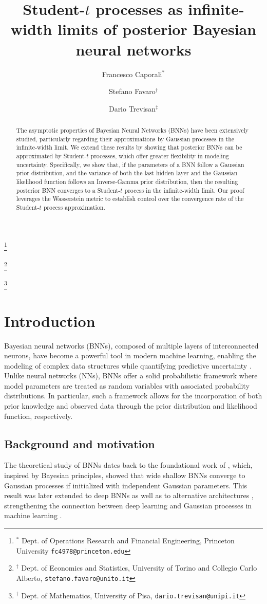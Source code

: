 \documentclass[a4paper, 11pt, reqno]{amsart}
\title[Student-\texorpdfstring{$t$}{t} processes as infinite-width limits of posterior BNNs]{Student-\texorpdfstring{$t$}{t} processes as infinite-width limits of posterior Bayesian neural networks}
\author[F. Caporali]{Francesco Caporali$^*$}
\author[S. Favaro]{Stefano Favaro$^\dag$}
\author[D. Trevisan]{Dario Trevisan$^\ddag$}
\affiliation[$^*$]{Dept. of Operations Research and Financial Engineering, Princeton University \texttt{fc4978@princeton.edu}}
\affiliation[$^\dag$]{Dept. of Economics and Statistics, University of Torino and Collegio Carlo Alberto, \texttt{stefano.favaro@unito.it}}
\affiliation[$^\ddag$]{Dept. of Mathematics, University of Pisa, \texttt{dario.trevisan@unipi.it}}
\makeatletter
\newcommand\affiliation[2][*]{\begingroup
		\renewcommand\thefootnote{}\footnote{#1 #2}%
		\addtocounter{footnote}{-1}%
		\endgroup}
\newcommand{\citet}[2][]{\citeauthor{#2} \cite[#1]{#2}}
\newcommand{\citep}[2][]{\cite[#1]{#2}}
\theoremstyle{plain}
\theoremstyle{remark}
\theoremstyle{definition}
\newcommand{\makeaffiliations}{
    \affiliation[$^*$]{Dept. of Operations Research and Financial Engineering, Princeton University \texttt{fc4978@princeton.edu}}
    \affiliation[$^\dag$]{Dept. of Economics and Statistics, University of Torino and Collegio Carlo Alberto, \texttt{stefano.favaro@unito.it}}
    \affiliation[$^\ddag$]{Dept. of Mathematics, University of Pisa, \texttt{dario.trevisan@unipi.it}}
}
\makeatother
\begin{document}
\begin{abstract}
	The asymptotic properties of Bayesian Neural Networks (BNNs) have been extensively studied, particularly regarding their approximations by Gaussian processes in the infinite-width limit. 
	We extend these results by showing that posterior BNNs can be approximated by Student-$t$ processes, which offer greater flexibility in modeling uncertainty. 
	Specifically, we show that, if the parameters of a BNN follow a Gaussian prior distribution, and the variance of both the last hidden layer and the Gaussian likelihood function follows an Inverse-Gamma prior distribution, then the resulting posterior BNN converges to a Student-$t$ process in the infinite-width limit. 
	Our proof leverages the Wasserstein metric to establish control over the convergence rate of the Student-$t$ process approximation.
\end{abstract}%

\maketitle
\makeaffiliations

\section{Introduction} \label{sec:intro}

Bayesian neural networks (BNNs), composed of multiple layers of interconnected neurons, have become a powerful tool in modern machine learning, enabling the modeling of complex data structures while quantifying predictive uncertainty \citep{neal1996}. Unlike neural networks (NNs), BNNs offer a solid probabilistic framework where model parameters are treated as random variables with associated probability distributions. In particular, such a framework allows for the incorporation of both prior knowledge and observed data through the prior distribution and likelihood function, respectively.

\subsection{Background and motivation}

The theoretical study of BNNs dates back to the foundational work of \citet{neal1996}, which, inspired by Bayesian principles, showed that wide shallow BNNs converge to Gaussian processes if initialized with independent Gaussian parameters. 
This result was later extended to deep BNNs  \citep{matthews2018,lee2018,basteri2022,favaro2024} as well as to alternative architectures \citep{novak2020,yang2021}, strengthening the connection between deep learning and Gaussian processes in machine learning \citep{gp2006}.
\end{document}
